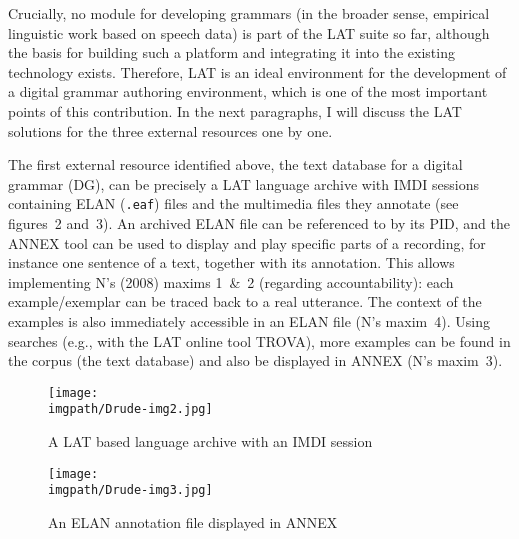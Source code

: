 Crucially, no module for developing grammars (in the broader sense, empirical linguistic work based on speech data) is part of the LAT suite so far, although the basis for building such a platform and integrating it into the existing technology exists. Therefore, LAT is an ideal environment for the development of a digital grammar authoring environment, which is one of the most important points of this contribution. In the next paragraphs, I will discuss the LAT solutions for the three external resources one by one.

The first external resource identified above, the text database for a digital grammar (DG), can be precisely a LAT language archive with IMDI sessions containing ELAN (\texttt{.eaf}) files and the multimedia files they annotate (see figures~2 and~3). An archived ELAN file can be referenced to by its PID, and the ANNEX tool can be used to display and play specific parts of a recording, for instance one sentence of a text, together with its annotation. This allows implementing N's (2008) maxims 1~\&~2 (regarding accountability): each example/exemplar can be traced back to a real utterance. The context of the examples is also immediately accessible in an ELAN file (N's maxim~4). Using searches (e.g., with the LAT online tool TROVA), more examples can be found in the corpus (the text database) and also be displayed in ANNEX (N's maxim~3).


\begin{figure}
\texttt{[image: \\imgpath/Drude-img2.jpg]}
\caption{ A LAT based language archive with an IMDI session }
 \end{figure}



\begin{figure}
\texttt{[image: \\imgpath/Drude-img3.jpg]}
 \caption{An ELAN annotation file displayed in ANNEX}
\end{figure}

